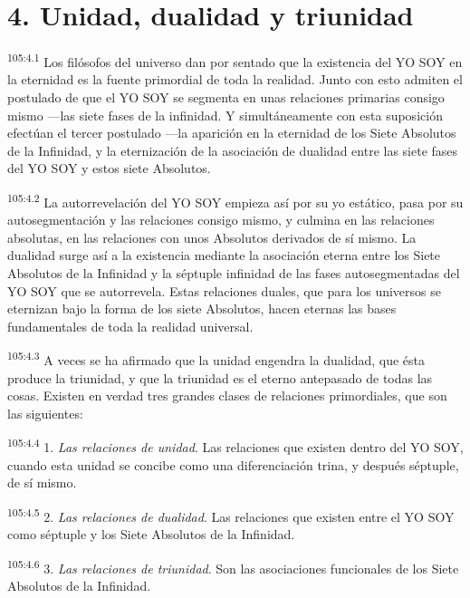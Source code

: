 \section*{4. Unidad, dualidad y triunidad}
\par
\textsuperscript{105:4.1} Los filósofos del universo dan por sentado que la existencia del YO SOY en la eternidad es la fuente primordial de toda la realidad. Junto con esto admiten el postulado de que el YO SOY se segmenta en unas relaciones primarias consigo mismo ---las siete fases de la infinidad. Y simultáneamente con esta suposición efectúan el tercer postulado ---la aparición en la eternidad de los Siete Absolutos de la Infinidad, y la eternización de la asociación de dualidad entre las siete fases del YO SOY y estos siete Absolutos.

\par
\textsuperscript{105:4.2} La autorrevelación del YO SOY empieza así por su yo estático, pasa por su autosegmentación y las relaciones consigo mismo, y culmina en las relaciones absolutas, en las relaciones con unos Absolutos derivados de sí mismo. La dualidad surge así a la existencia mediante la asociación eterna entre los Siete Absolutos de la Infinidad y la séptuple infinidad de las fases autosegmentadas del YO SOY que se autorrevela. Estas relaciones duales, que para los universos se eternizan bajo la forma de los siete Absolutos, hacen eternas las bases fundamentales de toda la realidad universal.

\par
\textsuperscript{105:4.3} A veces se ha afirmado que la unidad engendra la dualidad, que ésta produce la triunidad, y que la triunidad es el eterno antepasado de todas las cosas. Existen en verdad tres grandes clases de relaciones primordiales, que son las siguientes:

\par
\textsuperscript{105:4.4} 1. \textit{Las relaciones de unidad}. Las relaciones que existen dentro del YO SOY, cuando esta unidad se concibe como una diferenciación trina, y después séptuple, de sí mismo.

\par
\textsuperscript{105:4.5} 2. \textit{Las relaciones de dualidad}. Las relaciones que existen entre el YO SOY como séptuple y los Siete Absolutos de la Infinidad.

\par
\textsuperscript{105:4.6} 3. \textit{Las relaciones de triunidad}. Son las asociaciones funcionales de los Siete Absolutos de la Infinidad.

